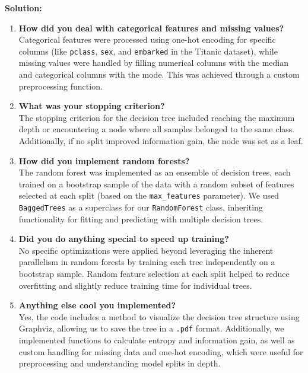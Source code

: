 \documentclass{article}
\newenvironment{solution}{\color{blue} \smallskip \textbf{Solution:}}{}
\begin{document}
\begin{solution}


\begin{enumerate}
    \item \textbf{How did you deal with categorical features and missing values?} \\
    Categorical features were processed using one-hot encoding for specific columns (like \texttt{pclass}, \texttt{sex}, and \texttt{embarked} in the Titanic dataset), while missing values were handled by filling numerical columns with the median and categorical columns with the mode. This was achieved through a custom preprocessing function.

    \item \textbf{What was your stopping criterion?} \\
    The stopping criterion for the decision tree included reaching the maximum depth or encountering a node where all samples belonged to the same class. Additionally, if no split improved information gain, the node was set as a leaf.

    \item \textbf{How did you implement random forests?} \\
    The random forest was implemented as an ensemble of decision trees, each trained on a bootstrap sample of the data with a random subset of features selected at each split (based on the \texttt{max\_features} parameter). We used \texttt{BaggedTrees} as a superclass for our \texttt{RandomForest} class, inheriting functionality for fitting and predicting with multiple decision trees.

    \item \textbf{Did you do anything special to speed up training?} \\
    No specific optimizations were applied beyond leveraging the inherent parallelism in random forests by training each tree independently on a bootstrap sample. Random feature selection at each split helped to reduce overfitting and slightly reduce training time for individual trees.

    \item \textbf{Anything else cool you implemented?} \\
    Yes, the code includes a method to visualize the decision tree structure using Graphviz, allowing us to save the tree in a \texttt{.pdf} format. Additionally, we implemented functions to calculate entropy and information gain, as well as custom handling for missing data and one-hot encoding, which were useful for preprocessing and understanding model splits in depth.
\end{enumerate}




\end{solution}
\end{document}

